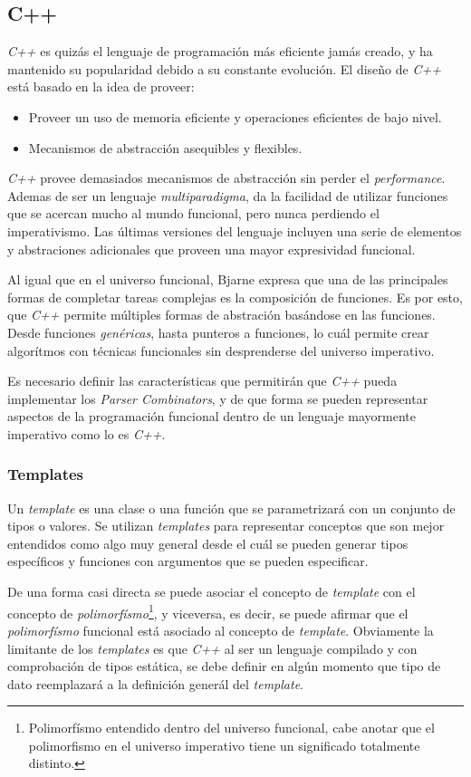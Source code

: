 	\subsection{C++}
	\emph{C++} es quizás el lenguaje de programación más eficiente jamás creado, y ha mantenido su popularidad debido a su constante evolución. El diseño de \emph{C++} está basado en la idea de proveer:	
	\begin{itemize}
		\item Proveer un uso de memoria eficiente y operaciones eficientes de bajo nivel.
		\item Mecanismos de abstracción asequibles y flexibles. \cite{Bjarne2013}
	\end{itemize}
	
	\emph{C++} provee demasiados mecanismos de abstracción sin perder el \emph{performance}. Ademas de ser un lenguaje \emph{multiparadigma}, da la facilidad de utilizar funciones que se acercan mucho al mundo funcional, pero nunca perdiendo el imperativismo. Las últimas versiones del lenguaje incluyen una serie de elementos y abstraciones adicionales que proveen una mayor expresividad funcional.
	
	Al igual que en el universo funcional, Bjarne expresa que una de las principales formas de completar tareas complejas es la composición de funciones. Es por esto, que \emph{C++} permite múltiples formas de abstración basándose en las funciones. Desde funciones \emph{genéricas}, hasta punteros a funciones, lo cuál permite crear algorítmos con técnicas funcionales sin desprenderse del universo imperativo. 
	
	Es necesario definir las características que permitirán que \emph{C++} pueda implementar los \emph{Parser Combinators}, y de que forma se pueden representar aspectos de la programación funcional dentro de un lenguaje mayormente imperativo como lo es \emph{C++}.
	
	\subsubsection{Templates}
		Un \emph{template} es una clase o una función que se parametrizará con un conjunto de tipos o valores. Se utilizan \emph{templates} para representar conceptos que son mejor entendidos como algo muy general desde el cuál se pueden generar tipos específicos y funciones con argumentos que se pueden especificar. \cite{Bjarne2013}
		
		De una forma casi directa se puede asociar el concepto de \emph{template} con el concepto de \emph{polimorfísmo}\footnote{Polimorfísmo entendido dentro del universo funcional, cabe anotar que el polimorfismo en el universo imperativo tiene un significado totalmente distinto.}, y viceversa, es decir, se puede afirmar que el \emph{polimorfísmo} funcional está asociado al concepto de \emph{template}. Obviamente la limitante de los \emph{templates} es que \emph{C++} al ser un lenguaje compilado y con comprobación de tipos estática, se debe definir en algún momento que tipo de dato reemplazará a la definición generál del \emph{template}.
		
